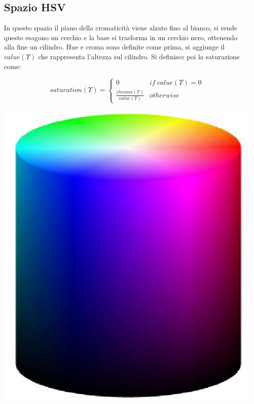 \subsection{Spazio HSV}
In questo spazio il piano della cromaticità viene alzato fino al bianco, si rende questo esagono un cerchio e la base si trasforma in un cerchio nero, ottenendo alla fine un cilindro. Hue e croma sono definite come prima, si aggiunge il $value(\Upsilon)$ che rappresenta l'altezza sul cilindro. Si definisce poi la saturazione come:\\
\begin{minipage}{.8\linewidth}
	\vspace{-.5cm}
	\begin{equation}
		saturation(\Upsilon) = 
		\begin{cases}
			0 & if\ value(\Upsilon) = 0 \\
			\frac{chroma(\Upsilon)}{value(\Upsilon)} & otherwise
		\end{cases}
	\end{equation}
\end{minipage}
\hspace{.05\linewidth}
\begin{minipage}{.15\linewidth}
	\centering
	\includegraphics[width=.9\linewidth]{Picture/HSV_Space}
\end{minipage}

